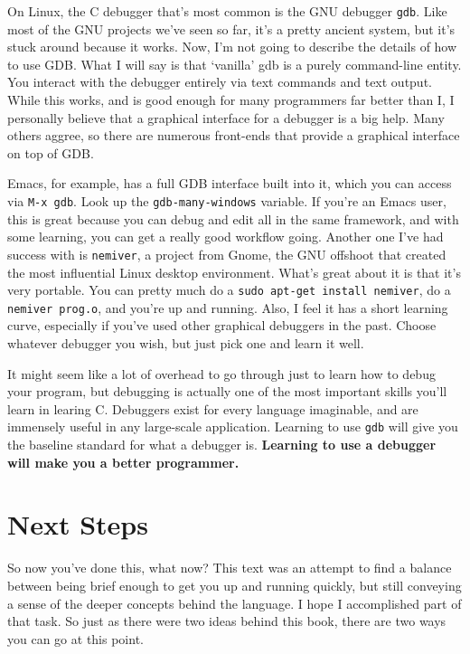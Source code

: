 \documentclass[ebook,11pt,oneside,openany]{memoir}
\newcommand{\cf}[1]{\texttt{#1}}
\begin{document}
On Linux, the C debugger that's most common is the GNU debugger \cf{gdb}. Like most of the GNU projects we've seen so far, it's a pretty ancient system, but it's stuck around because it works. Now, I'm not going to describe the details of how to use GDB. What I will say is that `vanilla' gdb is a purely command-line entity. You interact with the debugger entirely via text commands and text output. While this works, and is good enough for many programmers far better than I, I personally believe that a graphical interface for a debugger is a big help. Many others aggree, so there are numerous front-ends that provide a graphical interface on top of GDB. 

Emacs, for example, has a full GDB interface built into it, which you can access via \cf{M-x gdb}. Look up the \cf{gdb-many-windows} variable. If you're an Emacs user, this is great because you can debug and edit all in the same framework, and with some learning, you can get a really good workflow going. Another one I've had success with is \cf{nemiver}, a project from Gnome, the GNU offshoot that created the most influential Linux desktop environment. What's great about it is that it's very portable. You can pretty much do a \cf{sudo apt-get install nemiver}, do a \cf{nemiver prog.o}, and you're up and running. Also, I feel it has a short learning curve, especially if you've used other graphical debuggers in the past. Choose whatever debugger you wish, but just pick one and learn it well.

It might seem like a lot of overhead to go through just to learn how to debug your program, but debugging is actually one of the most important skills you'll learn in learing C. Debuggers exist for every language imaginable, and are immensely useful in any large-scale application. Learning to use \cf{gdb} will give you the baseline standard for what a debugger is. \textbf{Learning to use a debugger will make you a better programmer.}

\chapter{Next Steps}

So now you've done this, what now? This text was an attempt to find a balance between being brief enough to get you up and running quickly, but still conveying a sense of the deeper concepts behind the language. I hope I accomplished part of that task. So just as there were two ideas behind this book, there are two ways you can go at this point. 
\end{document}
